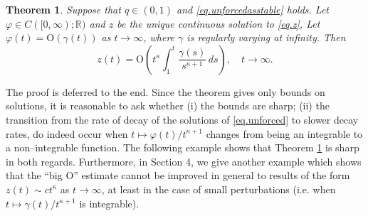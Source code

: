 \documentclass[a4paper,10pt,reqno]{amsart}
\numberwithin{equation}{section}
\newtheorem{theorem}{Theorem}
\theoremstyle{definition}
\theoremstyle{remark}
\DeclareMathOperator{\1}{\mathbbm 1}
\begin{document}
	\begin{theorem} \label{thm.growthbounds2}
		Suppose that $q\in (0,1)$ and \eqref{eq.unforcedasstable} holds. Let $\varphi\in C([0,\infty);\mathbb{R})$ and $z$ be the unique continuous solution to \eqref{eq.z},  Let $\varphi(t)=\text{O}(\gamma(t))$ as $t\to\infty$, where $\gamma$ is regularly varying at infinity. Then   
		\[
		z(t)=\text{O}\left(t^\kappa\int_1^t \frac{\gamma(s)}{s^{\kappa+1}}\,ds\right), \quad t\to\infty.
		\] 
	\end{theorem} 
	The proof is deferred to the end. Since the theorem gives only bounds on solutions, it is reasonable to ask whether (i) the bounds are sharp; (ii) the transition from the rate of decay of the  solutions of \eqref{eq.unforced} to slower decay rates, do indeed occur when $t\mapsto\varphi(t)/t^{\kappa+1}$ changes from being an integrable to a non--integrable function. The following example shows that Theorem \ref{thm.growthbounds2} is sharp in both regards. Furthermore, in Section 4, we give another example which shows that the ``big O'' estimate cannot be improved in general to results of the form $z(t)\sim c t^\kappa$ as $t\to\infty$, at least in the case of small perturbations (i.e. when $t\mapsto \gamma(t)/t^{\kappa+1}$ is integrable).     
\end{document}
